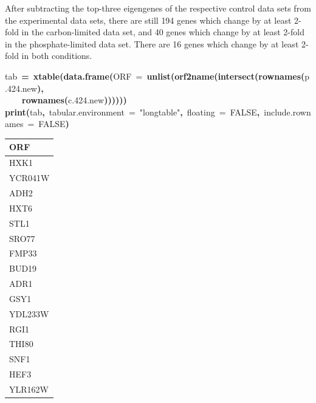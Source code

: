 \documentclass[letter]{article}\usepackage{graphicx, color}
\makeatletter
\newcommand{\hlnumber}[1]{\textcolor[rgb]{0,0,0}{#1}}%
\newcommand{\hlfunctioncall}[1]{\textcolor[rgb]{0.501960784313725,0,0.329411764705882}{\textbf{#1}}}%
\newcommand{\hlstring}[1]{\textcolor[rgb]{0.6,0.6,1}{#1}}%
\newcommand{\hlkeyword}[1]{\textcolor[rgb]{0,0,0}{\textbf{#1}}}%
\newcommand{\hlargument}[1]{\textcolor[rgb]{0.690196078431373,0.250980392156863,0.0196078431372549}{#1}}%
\newcommand{\hlassignement}[1]{\textcolor[rgb]{0,0,0}{\textbf{#1}}}%
\newcommand{\hlsymbol}[1]{\textcolor[rgb]{0,0,0}{#1}}%
\newcommand{\hlstd}[1]{\textcolor[rgb]{0,0,0}{#1}}%
\newenvironment{kframe}{%
 \def\FrameCommand##1{\hskip\@totalleftmargin \hskip-\fboxsep
 \colorbox{shadecolor}{##1}\hskip-\fboxsep
     \hskip-\linewidth \hskip-\@totalleftmargin \hskip\columnwidth}%
 \MakeFramed {\advance\hsize-\width
   \@totalleftmargin\z@ \linewidth\hsize
   \@setminipage}}%
 {\par\unskip\endMakeFramed}
\makeatother
\begin{document}
After subtracting the top-three eigengenes of the respective control data sets from the experimental data sets, there are still 194 genes which change by at least 2-fold in the carbon-limited data set, and 40 genes which change by at least 2-fold in the phosphate-limited data set. There are 16 genes which change by at least 2-fold in both conditions.
\begin{kframe}
\begin{flushleft}
\ttfamily\noindent
\hlsymbol{tab}{\ }\hlassignement{=}{\ }\hlfunctioncall{xtable}\hlkeyword{(}\hlfunctioncall{data.frame}\hlkeyword{(}\hlargument{ORF}{\ }\hlargument{=}{\ }\hlfunctioncall{unlist}\hlkeyword{(}\hlfunctioncall{orf2name}\hlkeyword{(}\hlfunctioncall{intersect}\hlkeyword{(}\hlfunctioncall{rownames}\hlkeyword{(}\hlsymbol{p.424.new}\hlkeyword{)}\hlkeyword{,}\hspace*{\fill}\\
\hlstd{}{\ }{\ }{\ }{\ }\hlfunctioncall{rownames}\hlkeyword{(}\hlsymbol{c.424.new}\hlkeyword{)}\hlkeyword{)}\hlkeyword{)}\hlkeyword{)}\hlkeyword{)}\hlkeyword{)}\hspace*{\fill}\\
\hlstd{}\hlfunctioncall{print}\hlkeyword{(}\hlsymbol{tab}\hlkeyword{,}{\ }\hlargument{tabular.environment}{\ }\hlargument{=}{\ }\hlstring{"{}longtable"{}}\hlkeyword{,}{\ }\hlargument{floating}{\ }\hlargument{=}{\ }\hlnumber{FALSE}\hlkeyword{,}{\ }\hlargument{include.rownames}{\ }\hlargument{=}{\ }\hlnumber{FALSE}\hlkeyword{)}\mbox{}
\normalfont
\end{flushleft}
\end{kframe}
\begin{longtable}{l}
  \hline
ORF \\ 
  \hline
HXK1 \\ 
  YCR041W \\ 
  ADH2 \\ 
  HXT6 \\ 
  STL1 \\ 
  SRO77 \\ 
  FMP33 \\ 
  BUD19 \\ 
  ADR1 \\ 
  GSY1 \\ 
  YDL233W \\ 
  RGI1 \\ 
  THI80 \\ 
  SNF1 \\ 
  HEF3 \\ 
  YLR162W \\ 
   \hline
\hline
\end{longtable}
\end{document}
